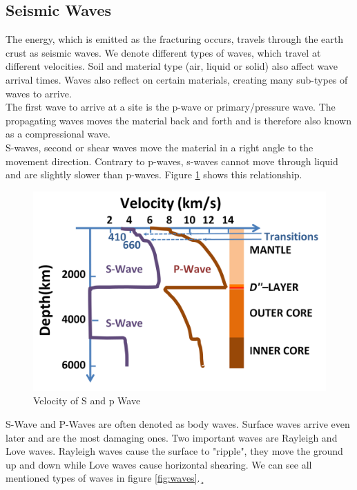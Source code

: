 \documentclass[thesis.tex]{subfiles}
\begin{document}
\subsection{Seismic Waves}
The energy, which is emitted as the fracturing occurs, travels through the earth crust as seismic waves. We denote different types of waves, which travel at different velocities. Soil and material type (air, liquid or solid) also affect wave arrival times. Waves also reflect on certain materials, creating many sub-types of waves to arrive.\\
The first wave to arrive at a site is the p-wave or primary/pressure wave. The propagating waves moves the material back and forth and is therefore also known as a compressional wave. \\
S-waves, second or shear waves move the material in a right angle to the movement direction. Contrary to p-waves, s-waves cannot move through liquid and are slightly slower than p-waves. Figure \ref{fig:speedwaves} shows this relationship.
\begin{figure}[hb]
	\centering
	\includegraphics[width=0.6\linewidth]{../pictures/Prerequisites/Speeds_of_seismic_waves.PNG}
	\caption{Velocity of S and p Wave}
	\label{fig:speedwaves}
\end{figure}
S-Wave and P-Waves are often denoted as body waves. Surface waves arrive even later and are the most damaging ones. Two important waves are Rayleigh and Love waves. Rayleigh waves cause the surface to "ripple", they move the ground up and down while Love waves cause horizontal shearing.
We can see all mentioned types of waves in figure \ref{fig:waves}.¸
\end{document}
